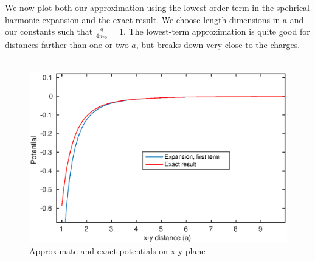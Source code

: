 \documentclass[a4paper,11pt]{article}
\numberwithin{equation}{section}
\newcommand{\ez}{\epsilon_0}
\begin{document}
We now plot both our approximation using the lowest-order term in the spehrical harmonic expansion and the exact result.
We choose length dimensions in a and our constants such that $\frac{q}{4\pi\ez}=1$. 
The lowest-term approximation is quite good for distances farther than one or two $a$, but breaks down very close to the charges.\\
\\
\begin{figure}[h]
 \caption{Approximate and exact potentials on x-y plane}
 \centering
   \includegraphics[width=\textwidth]{p41}
\end{figure}
\end{document}
